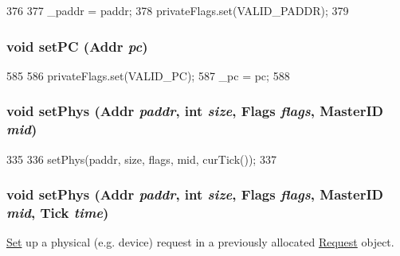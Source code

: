 \begin{DoxyCode}
376     {
377         _paddr = paddr;
378         privateFlags.set(VALID_PADDR);
379     }
\end{DoxyCode}
\hypertarget{classRequest_a26bcddb177835052e51f3accb1d2dea7}{
\subsubsection[{setPC}]{\setlength{\rightskip}{0pt plus 5cm}void setPC ({\bf Addr} {\em pc})}}
\label{classRequest_a26bcddb177835052e51f3accb1d2dea7}



\begin{DoxyCode}
585     {
586         privateFlags.set(VALID_PC);
587         _pc = pc;
588     }
\end{DoxyCode}
\hypertarget{classRequest_a61d0f89bbbb687136ff3fc5701a32f90}{
\subsubsection[{setPhys}]{\setlength{\rightskip}{0pt plus 5cm}void setPhys ({\bf Addr} {\em paddr}, \/  int {\em size}, \/  {\bf Flags} {\em flags}, \/  {\bf MasterID} {\em mid})}}
\label{classRequest_a61d0f89bbbb687136ff3fc5701a32f90}



\begin{DoxyCode}
335     {
336         setPhys(paddr, size, flags, mid, curTick());
337     }
\end{DoxyCode}
\hypertarget{classRequest_aeefca2329f8f252cd5c17463dc7f8fda}{
\subsubsection[{setPhys}]{\setlength{\rightskip}{0pt plus 5cm}void setPhys ({\bf Addr} {\em paddr}, \/  int {\em size}, \/  {\bf Flags} {\em flags}, \/  {\bf MasterID} {\em mid}, \/  {\bf Tick} {\em time})}}
\label{classRequest_aeefca2329f8f252cd5c17463dc7f8fda}
\hyperlink{classSet}{Set} up a physical (e.g. device) request in a previously allocated \hyperlink{classRequest}{Request} object. 


